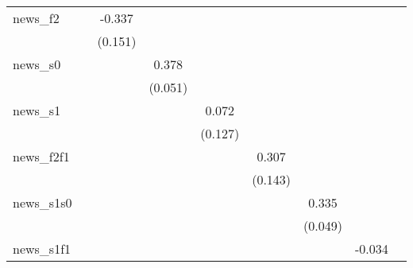 {\begin{tabular}{l*{8}{c}}
news\_f2     &                     &      -0.337\sym{**} &                     &                     &                     &                     &                     &                     \\
            &                     &     (0.151)         &                     &                     &                     &                     &                     &                     \\
\addlinespace
news\_s0     &                     &                     &       0.378\sym{***}&                     &                     &                     &                     &                     \\
            &                     &                     &     (0.051)         &                     &                     &                     &                     &                     \\
\addlinespace
news\_s1     &                     &                     &                     &       0.072         &                     &                     &                     &                     \\
            &                     &                     &                     &     (0.127)         &                     &                     &                     &                     \\
\addlinespace
news\_f2f1   &                     &                     &                     &                     &       0.307\sym{**} &                     &                     &                     \\
            &                     &                     &                     &                     &     (0.143)         &                     &                     &                     \\
\addlinespace
news\_s1s0   &                     &                     &                     &                     &                     &       0.335\sym{***}&                     &                     \\
            &                     &                     &                     &                     &                     &     (0.049)         &                     &                     \\
\addlinespace
news\_s1f1   &                     &                     &                     &                     &                     &                     &      -0.034         &                     \\

\end{tabular}}
